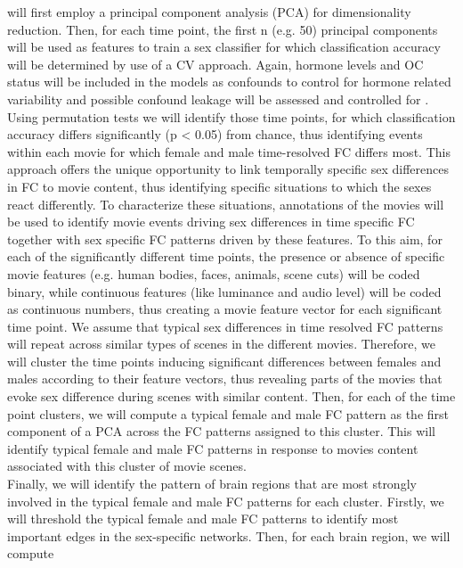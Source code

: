 \documentclass[11pt,a4paper]{article}
\begin{document}
will first employ a principal component analysis (PCA) for dimensionality reduction. Then, for each time
point, the first n (e.g. 50) principal components will be used as features to train a sex classifier for which
classification accuracy will be determined by use of a CV approach. Again, hormone levels and OC status
will be included in the models as confounds to control for hormone related variability and possible confound
leakage will be assessed and controlled for \parencite{hamdanConfoundleakageConfoundRemoval2022a}.\\
Using permutation tests we will identify those time points, for which classification accuracy differs
significantly (p < 0.05) from chance, thus identifying events within each movie for which female and male
time-resolved FC differs most. This approach offers the unique opportunity to link temporally specific sex
differences in FC to movie content, thus identifying specific situations to which the sexes react differently.
To characterize these situations, annotations of the movies will be used to identify movie events driving
sex differences in time specific FC together with sex specific FC patterns driven by these features. To this
aim, for each of the significantly different time points, the presence or absence of specific movie features
(e.g. human bodies, faces, animals, scene cuts) will be coded binary, while continuous features (like
luminance and audio level) will be coded as continuous numbers, thus creating a movie feature vector for
each significant time point. We assume that typical sex differences in time resolved FC patterns will repeat
across similar types of scenes in the different movies. Therefore, we will cluster the time points inducing
significant differences between females and males according to their feature vectors, thus revealing parts
of the movies that evoke sex difference during scenes with similar content. Then, for each of the time point
clusters, we will compute a typical female and male FC pattern as the first component of a PCA across the
FC patterns assigned to this cluster. This will identify typical female and male FC patterns in response to
movies content associated with this cluster of movie scenes.\\
Finally, we will identify the pattern of brain regions that are most strongly involved in the typical female
and male FC patterns for each cluster. Firstly, we will threshold the typical female and male FC patterns to
identify most important edges in the sex-specific networks. Then, for each brain region, we will compute
\end{document}
